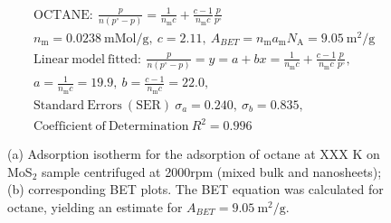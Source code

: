 

\begin{align*}
&\mathrm{OCTANE:}\ \frac{p}{n(p^\circ-p)}=\frac{1}{n_\mathrm{m}c}+\frac{c-1}{n_\mathrm{m}c}\frac{p}{p^\circ}\\
&{n_\mathrm{m}}=0.0238\ \mathrm{mMol/g},\ c=2.11,\ A_{BET}={n_\mathrm{m}}{a_\mathrm{m}}{N_\mathrm{A}}=9.05\ \mathrm{m}^2\mathrm{/g}\\
&\mathrm{Linear\ model\ fitted:}\ \frac{p}{n(p^\circ-p)}=y=a+bx=\frac{1}{n_\mathrm{m}c}+\frac{c-1}{n_\mathrm{m}c}\frac{p}{p^\circ},\\
&a=\frac{1}{n_\mathrm{m}c}=19.9,\ b=\frac{c-1}{n_\mathrm{m}c}=22.0,\\
&\mathrm{Standard\ Errors\ (SER)}\ \sigma_a=0.240,\ \sigma_b=0.835,\\
&\mathrm{Coefficient\ of\ Determination}\ R^2 = 0.996
\end{align*}


\begin{figure}[htb]
\hfill
{}
\caption{(a) Adsorption isotherm for the adsorption of octane at XXX K on MoS$_2$ 
sample centrifuged at 2000rpm (mixed bulk and nanosheets);
(b) corresponding BET plots. The BET equation was calculated for octane, yielding an estimate for $A_{BET}=9.05\ \mathrm{m}^2\mathrm{/g}$.}

\label{fig:sa-Reference-As-Supplied-13mg-2mm-30C-S1-SA-10ml}
\end{figure}


